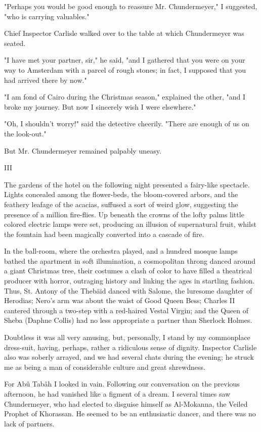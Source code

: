 "Perhaps you would be good enough to reassure Mr. Chundermeyer,"
I suggested, "who is carrying valuables."

Chief Inspector Carlisle walked over to the table at which
Chundermeyer was seated.

"I have met your partner, sir," he said, "and I gathered that you
were on your way to Amsterdam with a parcel of rough stones; in fact,
I supposed that you had arrived there by now."

"I am fond of Cairo during the Christmas season," explained the other,
"and I broke my journey. But now I sincerely wish I were elsewhere."

"Oh, I shouldn't worry!" said the detective cheerily. "There are
enough of us on the look-out."

But Mr. Chundermeyer remained palpably uneasy.


III

The gardens of the hotel on the following night presented a fairy-like
spectacle. Lights concealed among the flower-beds, the bloom-covered
arbors, and the feathery leafage of the acacias, suffused a sort of
weird glow, suggesting the presence of a million fire-flies. Up
beneath the crowns of the lofty palms little colored electric lamps
were set, producing an illusion of supernatural fruit, whilst the
fountain had been magically converted into a cascade of fire.

In the ball-room, where the orchestra played, and a hundred mosque
lamps bathed the apartment in soft illumination, a cosmopolitan throng
danced around a giant Christmas tree, their costumes a clash of color
to have filled a theatrical producer with horror, outraging history
and linking the ages in startling fashion. Thus, St. Antony of the
Thebäid danced with Salome, the luresome daughter of Herodias; Nero's
arm was about the waist of Good Queen Bess; Charles II cantered
through a two-step with a red-haired Vestal Virgin; and the Queen of
Sheba (Daphne Collis) had no less appropriate a partner than Sherlock
Holmes.

Doubtless it was all very amusing, but, personally, I stand by my
commonplace dress-suit, having, perhaps, rather a ridiculous sense
of dignity. Inspector Carlisle also was soberly arrayed, and we had
several chats during the evening; he struck me as being a man of
considerable culture and great shrewdness.

For Abû Tabâh I looked in vain. Following our conversation on the
previous afternoon, he had vanished like a figment of a dream. I
several times saw Chundermeyer, who had elected to disguise himself
as Al-Mokanna, the Veiled Prophet of Khorassan. He seemed to be an
enthusiastic dancer, and there was no lack of partners.

